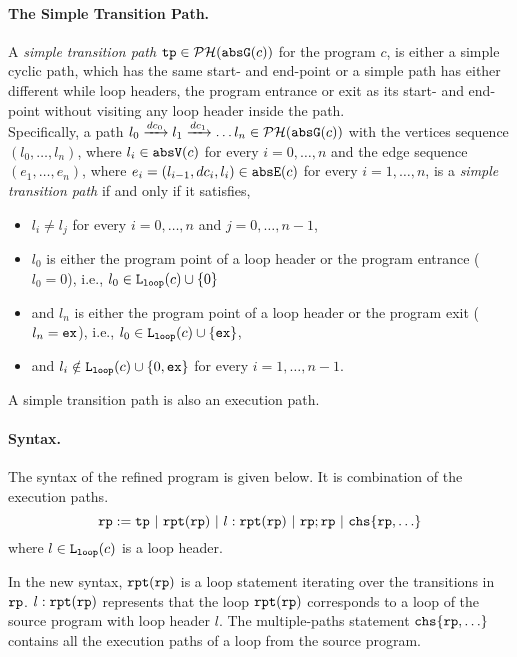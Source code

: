   \paragraph{The Simple Transition Path.}
  \begin{defn}
  \label{def:tpath}
A \emph{simple transition path}
$\mathtt{tp} \in \mathcal{PH}(\mathtt{abs}{\mathtt{G}}(c))$ for the program $c$, is either a simple cyclic path, which has the same start- and end-point
or a simple path has either different while loop headers, the program entrance or exit as its start- and end-point
without visiting any loop header inside the path.
\\
Specifically, a path $l_0 \xrightarrow{dc_0} l_1 \xrightarrow{dc_1} \ldots l_n \in \mathcal{PH}(\mathtt{abs}{\mathtt{G}}(c))$ with the
vertices sequence $(l_0, \ldots, l_n)$, where $l_i \in \mathtt{abs}{\mathtt{V}}(c)$ for every $i = 0, \ldots, n$ and
%
the edge sequence $(e_1, \ldots, e_n)$, where $e_i = (l_{i - 1}, dc_i, l_{i}) \in \mathtt{abs}{\mathtt{E}}(c)$ for every $i = 1, \ldots, n$,
%
is a \emph{simple transition path} if and only if it satisfies,
\begin{itemize}
  \item $l_i \neq l_j$ for every $i = 0, \ldots, n$ and $j = 0, \ldots, {n - 1}$,
  \item $l_0$ is either the program point of a loop header or the program entrance ($l_0 = 0$),
  i.e., $l_0 \in \mathtt{L}_{\mathtt{loop}}(c) \cup \{ 0 \}$
  \item and $l_n$ is either the program point of a loop header or the program exit ($l_n = \mathtt{ex}$),
  i.e., $l_0 \in \mathtt{L}_{\mathtt{loop}}(c) \cup \{ \mathtt{ex} \}$,
  \item and $l_i \notin \mathtt{L}_{\mathtt{loop}}(c) \cup \{ 0, \mathtt{ex} \}$ for every $i = 1, \ldots, n-1$.
\end{itemize}
\end{defn}
A simple transition path is also an execution path.

\paragraph{Syntax.}
The syntax of the refined program is given below. It is combination of the execution paths.
\[
    \rprog := \tpath ~|~ \rprepeat(\rprog) ~|~ l : \rprepeat(\rprog) ~|~ \rprog;\rprog ~|~ \rpchoose{\rprog, \ldots} 
\]
where $l\in \mathtt{L}_{\mathtt{loop}}(c)$ is a loop header.

In the new syntax, $\mathtt{rpt}(\mathtt{rp})$ is a loop statement iterating over the transitions in $\mathtt{rp}$.
$l: \mathtt{rpt}(\mathtt{rp})$ represents that the loop $ \mathtt{rpt}(\mathtt{rp})$
corresponds to a loop of the source program with loop header $l$.
The multiple-paths statement $\rpchoose{\rprog, \ldots} $ contains all the execution paths of a loop from the source program.

